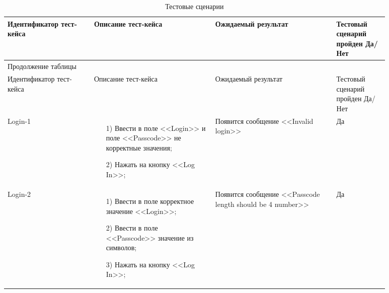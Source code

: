  \begin{longtable}{| >{\raggedright}p{0.20\linewidth} 
                  | >{\raggedright}p{0.28\linewidth} 
                  | >{\raggedright}p{0.28\linewidth} 
                  | >{\raggedright\arraybackslash}p{0.12\linewidth}|}
   \caption{Тестовые сценарии} \label{tab:long} \\

   \hline
   Идентификатор тест-кейса & Описание тест-кейса & Ожидаемый результат & Тестовый сценарий пройден Да/Нет \\
   \endfirsthead

\multicolumn{3}{l}%
{{\raggedright Продолжение таблицы \thetable{}}} \\
\hline
   Идентификатор тест-кейса & Описание тест-кейса & Ожидаемый результат & Тестовый сценарий пройден Да/Нет \\
\endhead
   \hline
   Login-1 &
   			\vspace{-6.5mm} 
   			\begin{enumerate} 
   				\item[1)] Ввести в поле <<Login>> и поле <<Passcode>> не корректные значения;
				\item[2)] Нажать на кнопку <<Log In>>;
			\end{enumerate}
   			 & Появится сообщение <<Invalid login>> & Да \\

   \hline
   Login-2 & 
   			\vspace{-6.5mm}
   			\begin{enumerate} 
   				\item[1)] Ввести в поле корректное значение <<Login>>;
				\item[2)] Ввести в поле <<Passcode>> значение из символов;
				\item[3)] Нажать на кнопку <<Log In>>;
			\end{enumerate}
			& Появится сообщение <<Passcode length should be 4 number>> & Да \\


\end{longtable}
